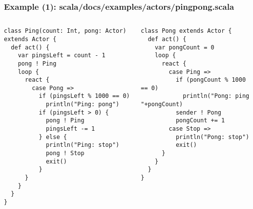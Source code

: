 \documentclass{beamer}
\begin{document}
\begin{frame}[fragile]
  \frametitle{Example (1): scala/docs/examples/actors/pingpong.scala}

  \begin{columns}
    \column{6cm}
{\tiny
\begin{verbatim}
class Ping(count: Int, pong: Actor) extends Actor {
  def act() {
    var pingsLeft = count - 1
    pong ! Ping
    loop {
      react {
        case Pong =>
          if (pingsLeft % 1000 == 0)
            println("Ping: pong")
          if (pingsLeft > 0) {
            pong ! Ping
            pingsLeft -= 1
          } else {
            println("Ping: stop")
            pong ! Stop
            exit()
          }
      }
    }
  }
}
\end{verbatim}
}

    \column{5cm}
{\tiny
\begin{verbatim}
class Pong extends Actor {
  def act() {
    var pongCount = 0
    loop {
      react {
        case Ping =>
          if (pongCount % 1000 == 0)
            println("Pong: ping "+pongCount)
          sender ! Pong
          pongCount += 1
        case Stop =>
          println("Pong: stop")
          exit()
      }
    }
  }
}
\end{verbatim}
}
  \end{columns}
\end{frame}
\end{document}
